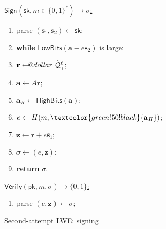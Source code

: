 \documentclass{template}
\makeatletter
\newcommand\leftarrowS{\leftarrow\joinrel\smalldollar}
\newcommand{\smalldollar}{\mathrel{\mathpalette\small@dollar\relax}}
\newcommand{\small@dollar}[2]{%
  \vcenter{\hbox{%
    $#1\textnormal{\fontsize{0.7\dimexpr\f@size pt}{0}\selectfont\$}$%
  }}%
}
\makeatother
\begin{document}
\begin{figure}[ht]
\centering
\begin{minipage}[t]{0.45\linewidth}
    \begin{mdframed}[linecolor=black, linewidth=1.0pt,
                     skipabove=5pt, skipbelow=5pt,
                     innerleftmargin=5pt, innerrightmargin=5pt]
        \centering
        \colorbox{green!10}{\underline{$\mathsf{Sign}(\mathsf{sk}, m \in \{0,1\}^*) \to \sigma$:}}
        \begin{enumerate}
            \item parse $(\mathbf{s}_1,\mathbf{s}_2) \gets \mathsf{sk}$;
            \item \textcolor{green!50!black}{\textbf{while} $\mathsf{LowBits}(\mathbf{a}-e\mathbf{s}_2)$ is large}:
            \item \hspace{20px}$\mathbf{r} \leftarrowS \widetilde{\mathcal{Q}}_{\gamma}^{\ell}$;
            \item \hspace{20px}$\mathbf{a} \gets A\mathbf{r}$; 
            \item \hspace{20px}\textcolor{green!50!black}{$\mathbf{a}_H \gets \mathsf{HighBits}(\mathbf{a})$};
            \item \hspace{20px}$e \gets H(m, \textcolor{green!50!black}{\mathbf{a}_H})$; 
            \item \hspace{20px}$\mathbf{z} \gets \mathbf{r} + e\mathbf{s}_1$;
            \item $\sigma \gets (e,\mathbf{z})$;
            \item \textbf{return} $\sigma$.
        \end{enumerate}
    \end{mdframed}
    \caption{Second-attempt LWE: signing} 
    \label{fig:second-attempt-sign}
\end{minipage}
\hfill
\begin{minipage}[t]{0.4\linewidth}
    \begin{mdframed}[linecolor=black, linewidth=1.0pt,
                     skipabove=5pt, skipbelow=5pt,
                     innerleftmargin=5pt, innerrightmargin=5pt]
        \centering
        \colorbox{green!10}{\underline{$\mathsf{Verify}(\mathsf{pk}, m, \sigma) \to \{0,1\}$:}}
        \begin{enumerate}
            \item parse $(e, \mathbf{z}) \gets \sigma$;

\end{enumerate}
\end{mdframed}
\end{minipage}
\end{figure}
\end{document}
